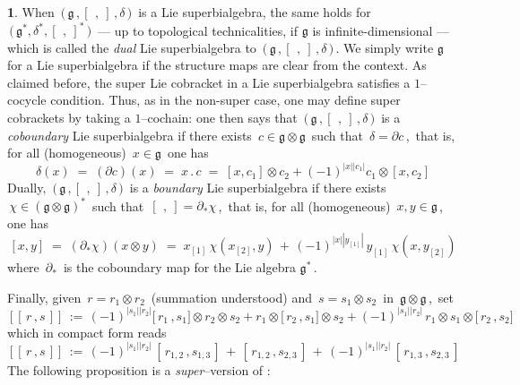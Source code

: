 \documentclass[12pt,reqno,twoside,a4paper]{amsart}
\numberwithin{equation}{section}
\theoremstyle{definition}
\newtheorem{free text}[lema]{}
\theoremstyle{remark}
\newcommand{\ot}{\otimes}
\def \lieg{\mathfrak{g}}
\theoremstyle{plain}
\begin{document}
\begin{free text}
%
 \vskip3pt
%
   When  $ \, \big(\, \lieg \, , [\,\ ,\ ] \, , \delta \,\big) \, $  is a Lie superbialgebra, the same holds for  $ \, \big(\, \lieg^* , \delta^* , {[\,\ ,\ ]}^* \,\big) \, $   --- up to topological technicalities, if  $ \lieg $  is infinite-dimensional ---   which is called the  \textit{dual\/}  Lie superbialgebra to  $ \, \big(\, \lieg \, , [\,\ ,\ ] \, , \delta \,\big) \, $.  We simply write  $ \lieg $  for a Lie superbialgebra if the structure maps are clear from the context.
%
 \vskip3pt
%
   As claimed before, the super Lie cobracket in a Lie superbialgebra satisfies a  $ 1 $--cocycle  condition. Thus, as in the non-super case, one may define super cobrackets by taking a  $ 1 $--cochain:  one then says that  $ \, \big(\, \lieg \, , [\,\ ,\ ] \, , \delta \,\big) \, $  is a  \textit{coboundary\/}  Lie superbialgebra if there exists  $ \, c \in \lieg \ot \lieg \, $  such that  $ \, \delta = \partial{}c \, $, \,that is, for all (homogeneous)  $ \, x \in \lieg \, $  one has
%
  $$  \delta(x)  \; = \;  (\partial{}c)(x)  \; = \;  x\,.\,c  \; = \;  [x,c_1] \ot c_2 + {(-1)}^{|x||c_1|} c_1 \ot [x,c_2]  $$
%
 \vskip3pt
%
   Dually,  $ \, \big(\, \lieg \, , [\,\ ,\ ] \, , \delta \,\big) \, $  is a  \textit{boundary\/}  Lie superbialgebra if there exists  $ \, \chi \in {( \lieg \ot \lieg)}^* \, $  such that  $ \, [\,\ ,\ ] = \partial_*{}\chi \, $,  \,that is, for all (homogeneous)  $ \, x , y \in \lieg \, $,  \,one has
%
  $$  [x,y]  \; = \;  (\partial_*{}\chi)(x \ot y)  \; = \;  x_{[1]} \, \chi(x_{[2]},y) \, + \, {(-1)}^{|x| |y_{[1]}|} \, y_{[1]} \, \chi(x,y_{[2]})  $$
%
 where  $ \, \partial_* \, $  is the coboundary map for the Lie algebra  $ \lieg^* \, $.
                                                                      \par
   Finally, given  $ \, r = r_1 \otimes r_2 \, $  (summation understood) and  $ \, s = s_1 \otimes s_2 \, $  in  $ \, \lieg \otimes \lieg \, $,  \,set
%
  $$  [\![\,r\,,s\,]\!]  \, := \,  {(-1)}^{|s_1||r_2|} \big[\,r_1\,,s_1\big] \otimes r_2 \otimes s_2 + r_1 \otimes \big[\,r_2\,,s_1\big] \otimes s_2 + {(-1)}^{|s_1||r_2|} \, r_1 \otimes s_1 \otimes \big[\,r_2\,,s_2\big]  $$
%
 which in compact form reads
%
  $$  [\![\,r\,,s\,]\!]  \, := \,  (-1)^{|s_1||r_2|} \, [\,r_{1,2}\,,s_{1,3}\,] \, + \, [\,r_{1,2}\,,s_{2,3}\,] \, + \, {(-1)}^{|s_1||r_2|} \, [\,r_{1,3}\,,s_{2,3}\,]  $$
%
 The following proposition is a  \textit{super}--version  of  \cite[Proposition 8.1.3]{Mj}:
%
\end{free text}

\vskip5pt
\end{document}
